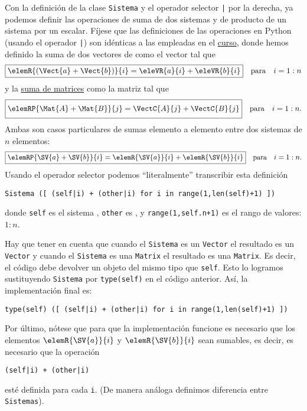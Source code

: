 \documentclass[11pt]{report}
\begin{document}
Con la definición de la clase \texttt{Sistema} y el operador selector \texttt{|} por
la derecha, ya podemos definir las operaciones de suma de dos sistemas
y de producto de un sistema por un escalar. Fíjese que las
definiciones de las operaciones en Python (usando el operador \texttt{|}) son
idénticas a las empleadas en el \href{https://mbujosab.github.io/CursoDeAlgebraLineal/libro.pdf\#section.1.2}{curso}, donde hemos definido la suma de
dos vectores de \R[n] como el vector tal que
\begin{displaymath}
  \fbox{\begin{math} \elemR{(\Vect{a}+\Vect{b})}{i}=\eleVR{a}{i}+\eleVR{b}{i} \end{math}}
  \quad\text{para}\quad i=1:n
\end{displaymath}
y la \href{https://mbujosab.github.io/CursoDeAlgebraLineal/libro.pdf\#section.1.5}{suma de matrices} como la matriz tal que
\begin{displaymath}
  \fbox{\begin{math} \elemRP{\Mat{A}+\Mat{B}}{j}=\VectC{A}{j}+\VectC{B}{j} \vphantom{\Big(} \end{math}}
  \quad\text{para}\quad i=1:n.
\end{displaymath}
Ambas son casos particulares de sumas elemento a elemento entre dos sistemas de \(n\) elementos:
\begin{displaymath}
  \fbox{\begin{math} \elemRP{\SV{a}+\SV{b}}{i}=\elemR{\SV{a}}{i}+\elemR{\SV{b}}{i} \end{math}}
  \quad\text{para}\quad i=1:n.
\end{displaymath}
Usando el operador selector podemos ``literalmente'' transcribir esta definición
\begin{verbatim}
Sistema ([ (self|i) + (other|i) for i in range(1,len(self)+1) ])
\end{verbatim}
donde \texttt{self} es el sistema , \texttt{other} es , y
\texttt{range(1,self.n+1)} es el rango de valores: \(1:n\).

Hay que tener en cuenta que cuando el \texttt{Sistema} es un \texttt{Vector} el
resultado es un \texttt{Vector} y cuando el \texttt{Sistema} es una \texttt{Matrix} el
resultado es una \texttt{Matrix}. Es decir, el código debe devolver un objeto
del mismo tipo que \texttt{self}. Esto lo logramos sustituyendo \texttt{Sistema} por
\texttt{type(self)} en el código anterior. Así, la implementación final es:
\begin{verbatim}
type(self) ([ (self|i) + (other|i) for i in range(1,len(self)+1) ])
\end{verbatim}
Por último, nótese que para que la implementación funcione es
necesario que los elementos \(\elemR{\SV{a}}{i}\) y \(\elemR{\SV{b}}{i}\)
sean sumables, es decir, es necesario que la operación
\begin{verbatim}
(self|i) + (other|i)
\end{verbatim}
esté definida para cada \texttt{i}. (De manera análoga definimos diferencia
entre \texttt{Sistemas}).
\end{document}
